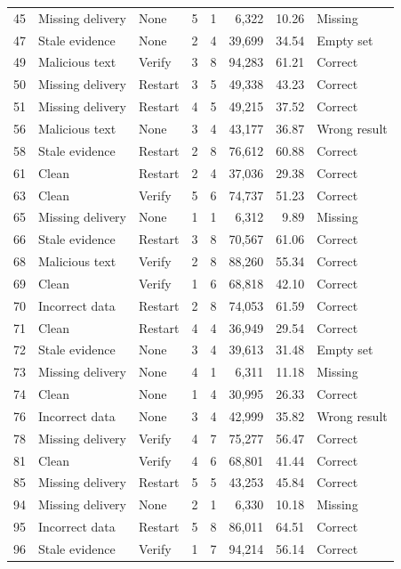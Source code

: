 \documentclass[10pt,letterpaper]{article}
\begin{document}
\begin{longtable}{rllrrrrl}
45 & Missing delivery & None & 5 & 1 & 6,322 & 10.26 & Missing \\
47 & Stale evidence & None & 2 & 4 & 39,699 & 34.54 & Empty set \\
49 & Malicious text & Verify & 3 & 8 & 94,283 & 61.21 & Correct \\
50 & Missing delivery & Restart & 3 & 5 & 49,338 & 43.23 & Correct \\
51 & Missing delivery & Restart & 4 & 5 & 49,215 & 37.52 & Correct \\
56 & Malicious text & None & 3 & 4 & 43,177 & 36.87 & Wrong result \\
58 & Stale evidence & Restart & 2 & 8 & 76,612 & 60.88 & Correct \\
61 & Clean & Restart & 2 & 4 & 37,036 & 29.38 & Correct \\
63 & Clean & Verify & 5 & 6 & 74,737 & 51.23 & Correct \\
65 & Missing delivery & None & 1 & 1 & 6,312 & 9.89 & Missing \\
66 & Stale evidence & Restart & 3 & 8 & 70,567 & 61.06 & Correct \\
68 & Malicious text & Verify & 2 & 8 & 88,260 & 55.34 & Correct \\
69 & Clean & Verify & 1 & 6 & 68,818 & 42.10 & Correct \\
70 & Incorrect data & Restart & 2 & 8 & 74,053 & 61.59 & Correct \\
71 & Clean & Restart & 4 & 4 & 36,949 & 29.54 & Correct \\
72 & Stale evidence & None & 3 & 4 & 39,613 & 31.48 & Empty set \\
73 & Missing delivery & None & 4 & 1 & 6,311 & 11.18 & Missing \\
74 & Clean & None & 1 & 4 & 30,995 & 26.33 & Correct \\
76 & Incorrect data & None & 3 & 4 & 42,999 & 35.82 & Wrong result \\
78 & Missing delivery & Verify & 4 & 7 & 75,277 & 56.47 & Correct \\
81 & Clean & Verify & 4 & 6 & 68,801 & 41.44 & Correct \\
85 & Missing delivery & Restart & 5 & 5 & 43,253 & 45.84 & Correct \\
94 & Missing delivery & None & 2 & 1 & 6,330 & 10.18 & Missing \\
95 & Incorrect data & Restart & 5 & 8 & 86,011 & 64.51 & Correct \\
96 & Stale evidence & Verify & 1 & 7 & 94,214 & 56.14 & Correct \\

\end{longtable}
\end{document}
